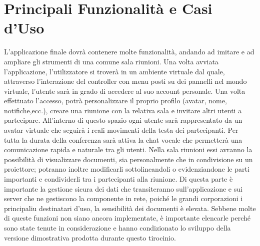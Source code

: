 \section{Principali Funzionalità e Casi d'Uso}
L'applicazione finale dovrà contenere molte funzionalità, andando ad imitare e ad ampliare gli strumenti di una comune sala riunioni. Una volta avviata l'applicazione, l'utilizzatore si troverà in un ambiente virtuale dal quale, attraverso l'interazione del controller con menu posti su dei pannelli nel mondo virtuale, l'utente sarà in grado di accedere al suo account personale. Una volta effettuato l'accesso, potrà personalizzare il proprio profilo (avatar, nome, notifiche,ecc.), creare una riunione con la relativa sala e invitare altri utenti a partecipare. All'interno di questo spazio ogni utente sarà rappresentato da un avatar virtuale che seguirà i reali movimenti della testa dei partecipanti. Per tutta la durata della conferenza sarà attiva la chat vocale che permetterà una comunicazione rapida e naturale tra gli utenti. Nella sala riunioni essi avranno la possibilità di visualizzare documenti, sia personalmente che in condivisione su un proiettore; potranno inoltre modificarli sottolineandoli o evidenziandone le parti importanti e condividerli tra i partecipanti alla riunione. Di questa parte è importante la gestione sicura dei dati che transiteranno sull'applicazione e sui server che ne gestiscono la componente in rete, poiché le grandi corporazioni i principaliu destinatari d'uso, la sensibilità dei documenti è elevata. Sebbene molte di queste funzioni non siano ancora implementate, è importante elencarle perché sono state tenute in considerazione e hanno condizionato lo sviluppo della versione dimostrativa prodotta durante questo tirocinio.\\

